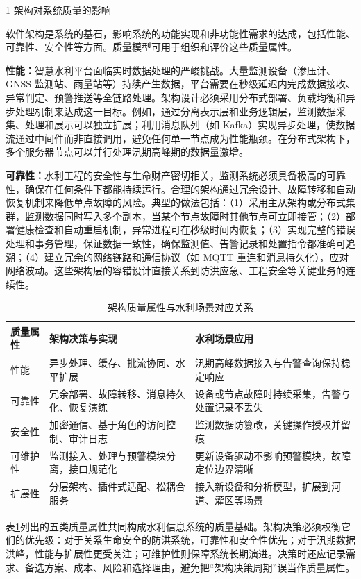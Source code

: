 1 架构对系统质量的影响

软件架构是系统的基石，影响系统的功能实现和非功能性需求的达成，包括性能、可靠性、安全性等方面。质量模型可用于组织和评价这些质量属性\cite{ISO25010,GB2006}。

\textbf{性能：}智慧水利平台面临实时数据处理的严峻挑战。大量监测设备（渗压计、GNSS 监测站、雨量站等）持续产生数据，平台需要在秒级延迟内完成数据接收、异常判定、预警推送等全链路处理。架构设计必须采用分布式部署、负载均衡和异步处理机制来达成这一目标。例如，通过分离表示层和业务逻辑层，监测数据采集、处理和展示可以独立扩展；利用消息队列（如 Kafka）实现异步处理，使数据流通过中间件而非直接调用，避免任何单一节点成为性能瓶颈。在分布式架构下，多个服务器节点可以并行处理汛期高峰期的数据量激增。

\textbf{可靠性：}水利工程的安全性与生命财产密切相关，监测系统必须具备极高的可靠性，确保在任何条件下都能持续运行。合理的架构通过冗余设计、故障转移和自动恢复机制来降低单点故障的风险。典型的做法包括：（1）采用主从架构或分布式集群，监测数据同时写入多个副本，当某个节点故障时其他节点可立即接管；（2）部署健康检查和自动重启机制，异常进程可在秒级时间内恢复；（3）实现完整的错误处理和事务管理，保证数据一致性，确保监测值、告警记录和处置指令都准确可追溯；（4）建立冗余的网络链路和通信协议（如 MQTT 重连和消息持久化），应对网络波动。这些架构层的容错设计直接关系到防洪应急、工程安全等关键业务的连续性。

\begin{table}[htbp]
\centering
\caption{架构质量属性与水利场景对应关系}\label{tab:quality-attributes}
\begin{tabular}{p{1.8cm}p{5.0cm}p{5.5cm}}
\toprule
质量属性 & 架构决策与实现 & 水利场景应用 \\
\midrule
性能 & 异步处理、缓存、批流协同、水平扩展 & 汛期高峰数据接入与告警查询保持稳定响应 \\
可靠性 & 冗余部署、故障转移、消息持久化、恢复演练 & 设备或节点故障时持续采集，告警与处置记录不丢失 \\
安全性 & 加密通信、基于角色的访问控制、审计日志 & 监测数据防篡改，关键操作授权并留痕 \\
可维护性 & 监测接入、处理与预警模块分离，接口规范化 & 更新设备驱动不影响预警模块，故障定位边界清晰 \\
扩展性 & 分层架构、插件式适配、松耦合服务 & 接入新设备和分析模型，扩展到河道、灌区等场景 \\
\bottomrule
\end{tabular}
\end{table}

表\ref{tab:quality-attributes}列出的五类质量属性共同构成水利信息系统的质量基础。架构决策必须权衡它们的优先级：对于关系生命安全的防洪系统，可靠性和安全性优先；对于汛期数据洪峰，性能与扩展性更受关注；可维护性则保障系统长期演进。决策时还应记录需求、备选方案、成本、风险和选择理由，避免把“架构决策周期”误当作质量属性。

